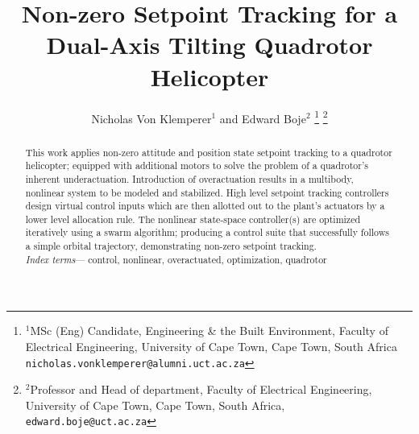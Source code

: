 \documentclass[a4paper, 10pt, conference]{ieeeconf}
\title{\LARGE \bf
Non-zero Setpoint Tracking for a Dual-Axis Tilting Quadrotor Helicopter
}
\author{Nicholas Von Klemperer$^{1}$ and Edward Boje$^{2}$%
\thanks{$^{1}$MSc (Eng) Candidate, Engineering \& the Built Environment, Faculty of Electrical Engineering, University of Cape Town, Cape Town, South Africa
{\tt\small nicholas.vonklemperer@alumni.uct.ac.za}}
\thanks{$^{2}$Professor and Head of department, Faculty of Electrical Engineering, University of Cape Town, Cape Town, South Africa,
        {\tt\small edward.boje@uct.ac.za}}%
}
\begin{document}
\maketitle
\thispagestyle{empty}
\pagestyle{empty}
\begin{abstract}
This work applies non-zero attitude and position state setpoint tracking to a quadrotor helicopter; equipped with additional motors to solve the problem of a quadrotor's inherent underactuation. Introduction of overactuation results in a multibody, nonlinear system to be modeled and stabilized. High level setpoint tracking controllers design virtual control inputs which are then allotted out to the plant's actuators by a lower level allocation rule. The nonlinear state-space controller(s) are optimized iteratively using a swarm algorithm; producing a control suite that successfully follows a simple orbital trajectory, demonstrating non-zero setpoint tracking.
\\
\emph{Index terms}--- control, nonlinear, overactuated, optimization, quadrotor
\end{abstract}
\end{document}
